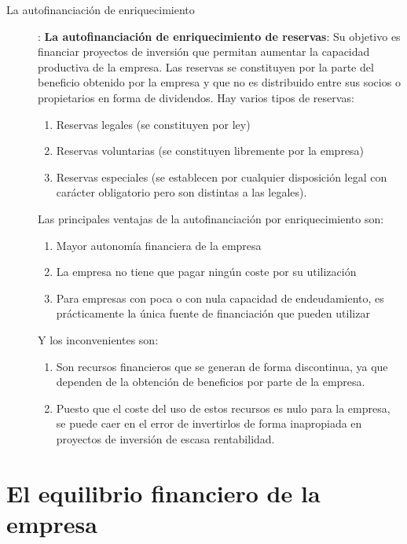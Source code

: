 \documentclass[10pt,a4paper,spanish]{report}
\begin{document}
\begin{description}
            			\item[La autofinanciación de enriquecimiento]: \textbf{La autofinanciación de enriquecimiento de reservas}: Su objetivo es financiar proyectos de inversión que permitan aumentar la capacidad productiva de la empresa. Las reservas se constituyen por la parte del beneficio obtenido por la empresa y que no es distribuido entre sus socios o propietarios en forma de dividendos. Hay varios tipos de reservas:
            			\begin{enumerate}
            				\item Reservas legales (se constituyen por ley)
            				\item Reservas voluntarias (se constituyen libremente por la empresa)
            				\item Reservas especiales (se establecen por cualquier disposición legal con carácter obligatorio pero son distintas a las legales).
            			\end{enumerate}
            			Las principales ventajas de la autofinanciación por enriquecimiento son:
            			\begin{enumerate}
            				\item Mayor autonomía financiera de la empresa
            				\item La empresa no tiene que pagar ningún coste por su utilización
            				\item Para empresas con poca o con nula capacidad de endeudamiento, es prácticamente la única fuente de financiación que pueden utilizar
            			\end{enumerate}
            			Y los inconvenientes son:
            			\begin{enumerate}
            				\item Son recursos financieros que se generan de forma discontinua, ya que dependen de la obtención de beneficios por parte de la empresa.
            				\item Puesto que el coste del uso de estos recursos es nulo para la empresa, se puede caer en el error de invertirlos de forma inapropiada en proyectos de inversión de escasa rentabilidad.
            			\end{enumerate}
            		\end{description}

    \section{\textcolor[rgb]{0.4,0.7,0.4}El equilibrio financiero de la empresa}
\end{document}
